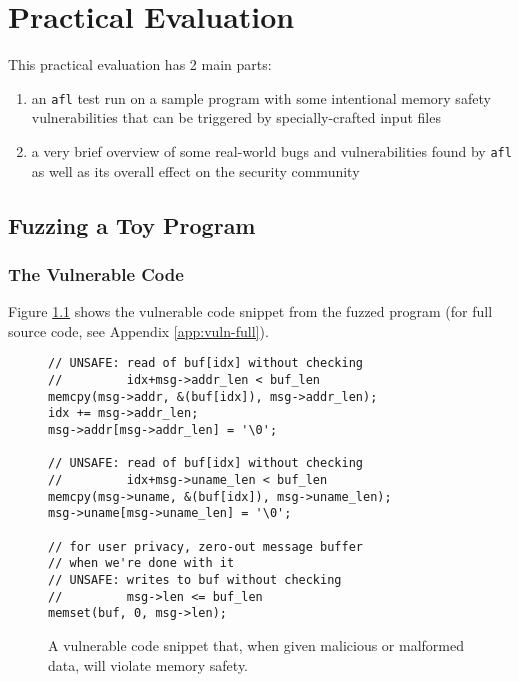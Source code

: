 \chapter{Practical Evaluation}

This practical evaluation has 2 main parts:
\begin{enumerate}
    \item an \texttt{afl} test run on a sample program with some intentional
    memory safety vulnerabilities that can be triggered by specially-crafted
    input files
    \item a very brief overview of some real-world bugs and vulnerabilities
    found by \texttt{afl} as well as its overall effect on the security
    community
\end{enumerate}

\section{Fuzzing a Toy Program}


\subsection{The Vulnerable Code}

Figure \ref{fig:vuln-snippet} shows the vulnerable code snippet from
the fuzzed program (for full source code, see Appendix \ref{app:vuln-full}).

\begin{figure}[H]
    \begin{lstlisting}[language={[ANSI]C}]
// UNSAFE: read of buf[idx] without checking
//         idx+msg->addr_len < buf_len
memcpy(msg->addr, &(buf[idx]), msg->addr_len);
idx += msg->addr_len;
msg->addr[msg->addr_len] = '\0';

// UNSAFE: read of buf[idx] without checking
//         idx+msg->uname_len < buf_len
memcpy(msg->uname, &(buf[idx]), msg->uname_len);
msg->uname[msg->uname_len] = '\0';                                         

// for user privacy, zero-out message buffer
// when we're done with it
// UNSAFE: writes to buf without checking
//         msg->len <= buf_len
memset(buf, 0, msg->len);
\end{lstlisting}
\caption{A vulnerable code snippet that, when given malicious or malformed data, will violate memory safety.}
\label{fig:vuln-snippet}
\end{figure}

